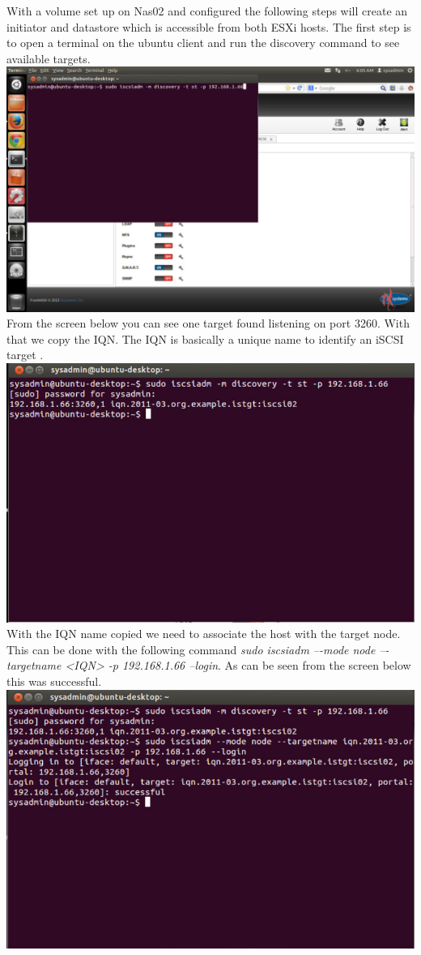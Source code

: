 With a volume set up on Nas02 and configured the following steps will create an initiator and datastore which is accessible from both ESXi hosts. The first step is to open a terminal on the ubuntu client and run the discovery command to see available targets.
\\\includegraphics[width=\textwidth]{14.png}
From the screen below you can see one target found listening on port 3260. With that we copy the IQN. The IQN is basically a unique name to identify an iSCSI target \cite{iqn}.
\\\includegraphics[width=\textwidth]{15.png}
With the IQN name copied we need to associate the host with the target node. This can be done with the following command \textit{sudo iscsiadm –-mode node –-targetname <IQN> -p 192.168.1.66 --login}. 
As can be seen from the screen below this was successful.
\\\includegraphics[width=\textwidth]{16.png}
